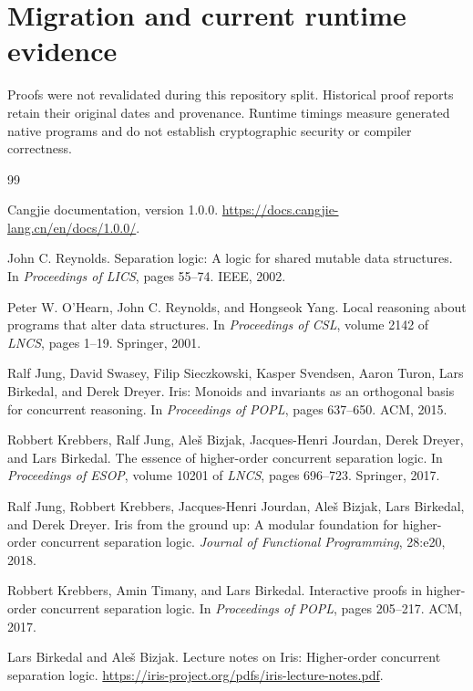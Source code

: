 \documentclass[11pt]{article}
\begin{document}
\section{Migration and current runtime evidence}
Proofs were not revalidated during this repository split. Historical proof reports retain their original dates and provenance. Runtime timings measure generated native programs and do not establish cryptographic security or compiler correctness.


\begin{thebibliography}{99}

Cangjie documentation, version 1.0.0.
\url{https://docs.cangjie-lang.cn/en/docs/1.0.0/}.

John C. Reynolds.
Separation logic: A logic for shared mutable data structures.
In \emph{Proceedings of LICS}, pages 55--74. IEEE, 2002.

Peter W. O'Hearn, John C. Reynolds, and Hongseok Yang.
Local reasoning about programs that alter data structures.
In \emph{Proceedings of CSL}, volume 2142 of \emph{LNCS}, pages 1--19. Springer, 2001.

Ralf Jung, David Swasey, Filip Sieczkowski, Kasper Svendsen, Aaron Turon, Lars Birkedal, and Derek Dreyer.
Iris: Monoids and invariants as an orthogonal basis for concurrent reasoning.
In \emph{Proceedings of POPL}, pages 637--650. ACM, 2015.

Robbert Krebbers, Ralf Jung, Ale\v{s} Bizjak, Jacques-Henri Jourdan, Derek Dreyer, and Lars Birkedal.
The essence of higher-order concurrent separation logic.
In \emph{Proceedings of ESOP}, volume 10201 of \emph{LNCS}, pages 696--723. Springer, 2017.

Ralf Jung, Robbert Krebbers, Jacques-Henri Jourdan, Ale\v{s} Bizjak, Lars Birkedal, and Derek Dreyer.
Iris from the ground up: A modular foundation for higher-order concurrent separation logic.
\emph{Journal of Functional Programming}, 28:e20, 2018.

Robbert Krebbers, Amin Timany, and Lars Birkedal.
Interactive proofs in higher-order concurrent separation logic.
In \emph{Proceedings of POPL}, pages 205--217. ACM, 2017.

Lars Birkedal and Ale\v{s} Bizjak.
Lecture notes on Iris: Higher-order concurrent separation logic.
\url{https://iris-project.org/pdfs/iris-lecture-notes.pdf}.


\end{thebibliography}
\end{document}
